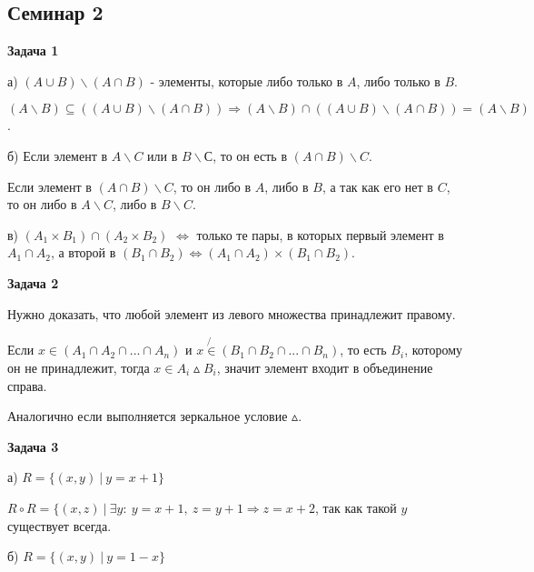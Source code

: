 \subsection{Семинар 2}
\begin{center}
\textbf{Задача 1}
\end{center}
а) $\displaystyle ( A\cup B) \backslash ( A\cap B)$ - элементы, которые либо только в $\displaystyle A$, либо только в $\displaystyle B$.

$\displaystyle ( A\backslash B) \subseteq (( A\cup B) \backslash ( A\cap B)) \Longrightarrow ( A\backslash B) \cap (( A\cup B) \backslash ( A\cap B)) =( A\backslash B)$.

б) Если элемент в $\displaystyle A\backslash C$ или в $\displaystyle B\backslash С$, то он есть в $\displaystyle ( A\cap B) \backslash C$.

Если элемент в $\displaystyle ( A\cap B) \backslash C$, то он либо в $\displaystyle A$, либо в $\displaystyle B$, а так как его нет в $\displaystyle C$, то он либо в $\displaystyle A\backslash C$, либо в $\displaystyle B\backslash C$.

в) $\displaystyle ( A_{1} \times B_{1}) \cap ( A_{2} \times B_{2})$ $\displaystyle \Leftrightarrow $ только те пары, в которых первый элемент в $\displaystyle A_{1} \cap A_{2}$, а второй в $\displaystyle ( B_{1} \cap B_{2})$$\displaystyle \Leftrightarrow $$\displaystyle ( A_{1} \cap A_{2}) \times ( B_{1} \cap B_{2})$.

\begin{center}
\textbf{Задача 2}
\end{center}
Нужно доказать, что любой элемент из левого множества принадлежит правому.

Если $\displaystyle x\in ( A_{1} \cap A_{2} \cap ...\cap A_{n})$ и $\displaystyle x\not{\in }( B_{1} \cap B_{2} \cap ...\cap B_{n})$, то есть $\displaystyle B_{i}$, которому он не принадлежит, тогда $\displaystyle x\in A_{i} \vartriangle B_{i}$, значит элемент входит в объединение справа.

Аналогично если выполняется зеркальное условие $\displaystyle \vartriangle $.

\begin{center}
\textbf{Задача 3}
\end{center}
а) $\displaystyle R=\{( x,y) \ |\ y=x+1\}$

$\displaystyle R\circ R=\{( x,z) \ |\ \exists y:\ y=x+1,\ z=y+1\Longrightarrow z=x+2$, так как такой $\displaystyle y$ существует всегда.

б) $\displaystyle R=\{( x,y) \ |\ y=1-x\}$

